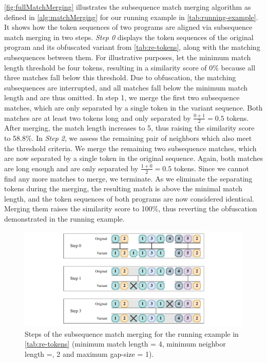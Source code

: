 \autoref{fig:fullMatchMerging} illustrates the subsequence match merging algorithm as defined in \autoref{alg:matchMerging} for our running example in \autoref{tab:running-example}. It shows how the token sequences of two programs are aligned via subsequence match merging in two steps. 
\textit{Step 0} displays the token sequences of the original program and its obfuscated variant from \autoref{tab:re-tokens}, along with the matching subsequences between them. For illustrative purposes, let the minimum match length threshold be four tokens, resulting in a similarity score of 0\% because all three matches fall below this threshold.
Due to obfuscation, the matching subsequences are interrupted, and all matches fall below the minimum match length and are thus omitted.
In step 1, we merge the first two subsequence matches, which are only separated by a single token in the variant sequence. Both matches are at least two tokens long and only separated by \(\frac{0 + 1}{2} = 0.5\) tokens.
After merging, the match length increases to 5, thus raising the similarity score to 58.8\%.
In \textit{Step 2}, we assess the remaining pair of neighbors which also meet the threshold criteria.
We merge the remaining two subsequence matches, which are now separated by a single token in the original sequence. Again, both matches are long enough and are only separated by \(\frac{1 + 0}{2} = 0.5\) tokens. Since we cannot find any more matches to merge, we terminate. As we eliminate the separating tokens during the merging, the resulting match is above the minimal match length, and the token sequences of both programs are now considered identical.
Merging them raises the similarity score to 100\%, thus reverting the obfuscation demonstrated in the running example.

\begin{figure}
\centering
\includegraphics[width=\linewidth]{figures/algorithm/steps.pdf}
\caption[Subsequence Match Merging Example]{Steps of the subsequence match merging for the running example in \autoref{tab:re-tokens} (minimum match length = 4, minimum neighbor length =, 2 and maximum gap-size = 1).}
\label{fig:fullMatchMerging}
\end{figure}

